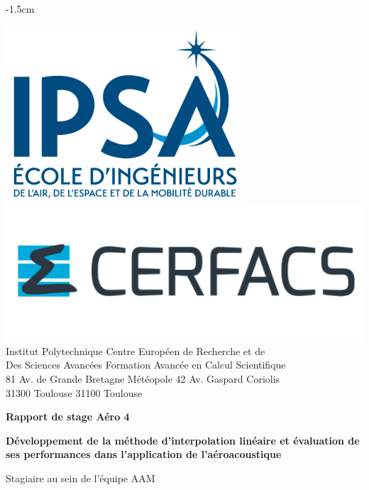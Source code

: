 \begin{titlepage}

    \changepage{3cm}%
           {}%
           {}%
           {}%
           {}%
           {-1.5cm}%
           {}%
           {}%
           {}%

    
    \parindent=0pt
    \includegraphics[scale=0.30]{images/ipsagarde.png}     \includegraphics[scale=0.4]{images/cerfacsgarde.png}\\
    Institut Polytechnique  Centre Européen de Recherche et de \\
    Des Sciences Avancées Formation Avancée en Calcul Scientifique\\
    81 Av. de Grande Bretagne Météopole 42 Av. Gaspard Coriolis\\
    31300 Toulouse 31100 Toulouse
    \vspace*{1.5cm}
    \begin{center}
        \bfseries\LARGE Rapport de stage Aéro 4
    \end{center}
    \hrulefill
    \begin{center}\bfseries\huge
        Développement de la méthode d'interpolation linéaire et évaluation de ses performances dans l'application de l'aéroacoustique
    \end{center}
    \begin{center}\huge
        Stagiaire au sein de l'équipe AAM
    \end{center}



\end{titlepage}

